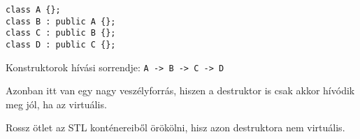 \documentclass[a4paper,11.5pt]{article}
\begin{document}
	\begin{lstlisting}
class A {};
class B : public A {};
class C : public B {};
class D : public C {};
	\end{lstlisting}
	Konstruktorok hívási sorrendje: \texttt{A -> B -> C -> D}
	
	Azonban itt van egy nagy veszélyforrás, hiszen a destruktor is csak akkor hívódik meg jól, ha az virtuális.
	
	Rossz ötlet az STL konténereiből örökölni, hisz azon destruktora nem virtuális. 
	
\end{document}
